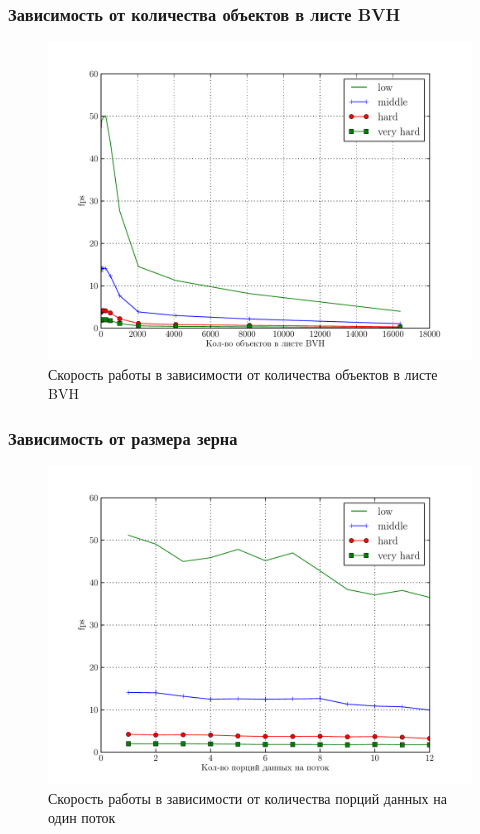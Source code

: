 \documentclass[12pt, a4paper, utf8]{article}
\begin{document}
\subsubsection{Зависимость от количества объектов в листе BVH}



\begin{figure}[H]
\centering
\includegraphics[width=\textwidth]{perf/performance_bvh.pdf}
\caption{Скорость работы в зависимости от количества объектов в листе BVH}\label{fig:performance_bvh}
\end{figure}

\subsubsection{Зависимость от размера зерна}



\begin{figure}[H]
\centering
\includegraphics[width=\textwidth]{perf/performance_gs.pdf}
\caption{Скорость работы в зависимости от количества порций данных на один поток}\label{fig:performance_gs}
\end{figure}
\end{document}
